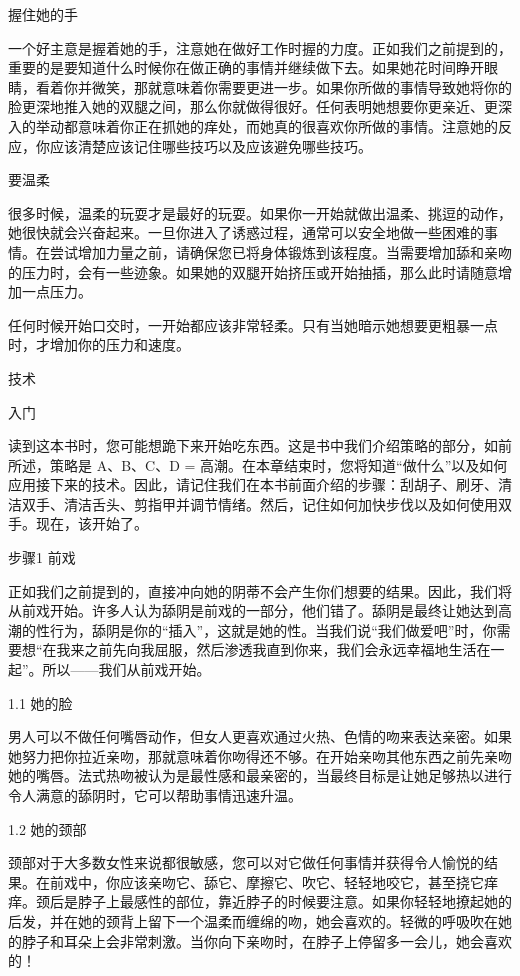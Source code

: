 \documentclass[12pt,UTF8]{ctexbook}
\begin{document}
握住她的手

一个好主意是握着她的手，注意她在做好工作时握的力度。正如我们之前提到的，重要的是要知道什么时候你在做正确的事情并继续做下去。如果她花时间睁开眼睛，看着你并微笑，那就意味着你需要更进一步。如果你所做的事情导致她将你的脸更深地推入她的双腿之间，那么你就做得很好。任何表明她想要你更亲近、更深入的举动都意味着你正在抓她的痒处，而她真的很喜欢你所做的事情。注意她的反应，你应该清楚应该记住哪些技巧以及应该避免哪些技巧。

要温柔

很多时候，温柔的玩耍才是最好的玩耍。如果你一开始就做出温柔、挑逗的动作，她很快就会兴奋起来。一旦你进入了诱惑过程，通常可以安全地做一些困难的事情。在尝试增加力量之前，请确保您已将身体锻炼到该程度。当需要增加舔和亲吻的压力时，会有一些迹象。如果她的双腿开始挤压或开始抽插，那么此时请随意增加一点压力。

任何时候开始口交时，一开始都应该非常轻柔。只有当她暗示她想要更粗暴一点时，才增加你的压力和速度。

技术

入门

读到这本书时，您可能想跪下来开始吃东西。这是书中我们介绍策略的部分，如前所述，策略是 A、B、C、D = 高潮。在本章结束时，您将知道“做什么”以及如何应用接下来的技术。因此，请记住我们在本书前面介绍的步骤：刮胡子、刷牙、清洁双手、清洁舌头、剪指甲并调节情绪。然后，记住如何加快步伐以及如何使用双手。现在，该开始了。

步骤1 前戏

正如我们之前提到的，直接冲向她的阴蒂不会产生你们想要的结果。因此，我们将从前戏开始。许多人认为舔阴是前戏的一部分，他们错了。舔阴是最终让她达到高潮的性行为，舔阴是你的“插入”，这就是她的性。当我们说“我们做爱吧”时，你需要想“在我来之前先向我屈服，然后渗透我直到你来，我们会永远幸福地生活在一起”。所以——我们从前戏开始。

1.1 她的脸

男人可以不做任何嘴唇动作，但女人更喜欢通过火热、色情的吻来表达亲密。如果她努力把你拉近亲吻，那就意味着你吻得还不够。在开始亲吻其他东西之前先亲吻她的嘴唇。法式热吻被认为是最性感和最亲密的，当最终目标是让她足够热以进行令人满意的舔阴时，它可以帮助事情迅速升温。

1.2 她的颈部

颈部对于大多数女性来说都很敏感，您可以对它做任何事情并获得令人愉悦的结果。在前戏中，你应该亲吻它、舔它、摩擦它、吹它、轻轻地咬它，甚至挠它痒痒。颈后是脖子上最感性的部位，靠近脖子的时候要注意。如果你轻轻地撩起她的后发，并在她的颈背上留下一个温柔而缠绵的吻，她会喜欢的。轻微的呼吸吹在她的脖子和耳朵上会非常刺激。当你向下亲吻时，在脖子上停留多一会儿，她会喜欢的！
\end{document}
